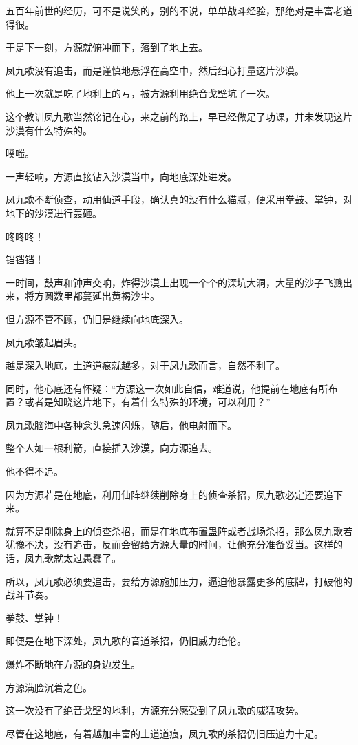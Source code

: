 \begin{this_body}
五百年前世的经历，可不是说笑的，别的不说，单单战斗经验，那绝对是丰富老道得很。

于是下一刻，方源就俯冲而下，落到了地上去。

凤九歌没有追击，而是谨慎地悬浮在高空中，然后细心打量这片沙漠。

他上一次就是吃了地利上的亏，被方源利用绝音戈壁坑了一次。

这个教训凤九歌当然铭记在心，来之前的路上，早已经做足了功课，并未发现这片沙漠有什么特殊的。

噗嗤。

一声轻响，方源直接钻入沙漠当中，向地底深处进发。

凤九歌不断侦查，动用仙道手段，确认真的没有什么猫腻，便采用拳鼓、掌钟，对地下的沙漠进行轰砸。

咚咚咚！

铛铛铛！

一时间，鼓声和钟声交响，炸得沙漠上出现一个个的深坑大洞，大量的沙子飞溅出来，将方圆数里都蔓延出黄褐沙尘。

但方源不管不顾，仍旧是继续向地底深入。

凤九歌皱起眉头。

越是深入地底，土道道痕就越多，对于凤九歌而言，自然不利了。

同时，他心底还有怀疑：“方源这一次如此自信，难道说，他提前在地底有所布置？或者是知晓这片地下，有着什么特殊的环境，可以利用？”

凤九歌脑海中各种念头急速闪烁，随后，他电射而下。

整个人如一根利箭，直接插入沙漠，向方源追去。

他不得不追。

因为方源若是在地底，利用仙阵继续削除身上的侦查杀招，凤九歌必定还要追下来。

就算不是削除身上的侦查杀招，而是在地底布置蛊阵或者战场杀招，那么凤九歌若犹豫不决，没有追击，反而会留给方源大量的时间，让他充分准备妥当。这样的话，凤九歌就太过愚蠢了。

所以，凤九歌必须要追击，要给方源施加压力，逼迫他暴露更多的底牌，打破他的战斗节奏。

拳鼓、掌钟！

即便是在地下深处，凤九歌的音道杀招，仍旧威力绝伦。

爆炸不断地在方源的身边发生。

方源满脸沉着之色。

这一次没有了绝音戈壁的地利，方源充分感受到了凤九歌的威猛攻势。

尽管在这地底，有着越加丰富的土道道痕，凤九歌的杀招仍旧压迫力十足。


\end{this_body}
